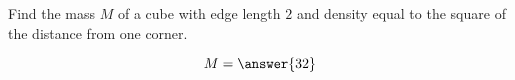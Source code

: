 \documentclass{ximera}
\author{David Guichard \and Neal Koblitz \and H. Jerome Keisler \and Albert Scheller \and Barry Balof \and Mike Wills \and Matthew Carr}
\begin{document}
\begin{exercise}





Find the mass $M$ of a cube with edge length $2$ and density equal to the square of the distance from one corner.
\begin{prompt}
\[
M=\answer{32}
\]
\end{prompt}



\end{exercise}
\end{document}
